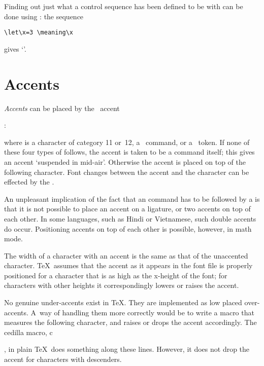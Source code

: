 Finding out just what a control sequence has been defined to be with
 can be done using :
the sequence
\begin{verbatim}
\let\x=3 \meaning\x
\end{verbatim}
gives
`'.

\section{Accents}

\emph{Accents} can be placed by the
~\csterm accent\par
\label{character}:
\begin{disp}%
     \end{disp} 
where  is a character of
category 11 or~12,
a~ command, or a~ token. If none
of these four types of  follows, the accent is taken to
be a  command itself; this gives an accent `suspended in
mid-air'. Otherwise the accent is placed on top of the following
character.  Font changes between the accent and the character can be
effected by the .

An unpleasant implication of the fact that an  command
has to be followed by a  is that it is not
possible to place an accent on a ligature, or
two accents on top of each other.
In some languages, such as Hindi or Vietnamese,
such double accents do occur.
Positioning accents on top of each other is possible,
however, in math mode.

The width of a character with an accent is the same as that of
the unaccented character. \TeX\ assumes that the 
accent as it appears in the font file
is properly positioned for a character that is as high
as the x-height of the font; for characters with other heights
it correspondingly lowers or raises the accent.

No genuine under-accents exist in \TeX. They are
implemented as low placed over-accents. A~way of handling
them more correctly would be to write a macro that
measures the following character, and raises or drops
the accent accordingly.
The cedilla macro, \cstoidx c\par,
in plain \TeX\ does something along these lines. However,
it does not drop the accent for characters with descenders.

